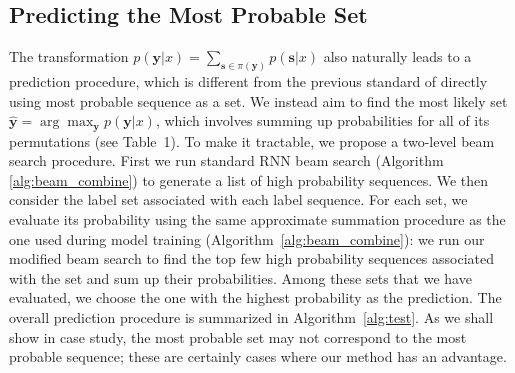 \subsection{Predicting the Most Probable Set}
The transformation $p(\mathbf{y}|x)=\sum_{\mathbf{s}\in \pi(\mathbf{y})} p(\mathbf{s}|x)$ also naturally leads to a prediction procedure, which is different from the previous standard of directly using most probable sequence as a set. We instead aim to find the most likely set $\hat{\mathbf{y}}=\arg\max_{\mathbf{y}} p(\mathbf{y}|x)$, which involves summing up probabilities for all of its permutations (see Table~1). To make it tractable, we propose a two-level beam search procedure. First we run standard RNN beam search (Algorithm \ref{alg:beam_combine}) to generate a list of high probability sequences.  We then consider the label set associated with each label sequence.  For each set, we evaluate its probability using the same approximate summation procedure as the one used during model training (Algorithm~\ref{alg:beam_combine}): we run our modified beam search to find the top few high probability sequences associated with the set and sum up their probabilities. Among these sets that we have evaluated, we choose the one with the highest probability as the prediction. The overall prediction procedure is summarized in Algorithm~\ref{alg:test}. As we shall show in case study, the most probable set may not correspond to the most probable sequence; these are certainly cases where our method has an advantage.



